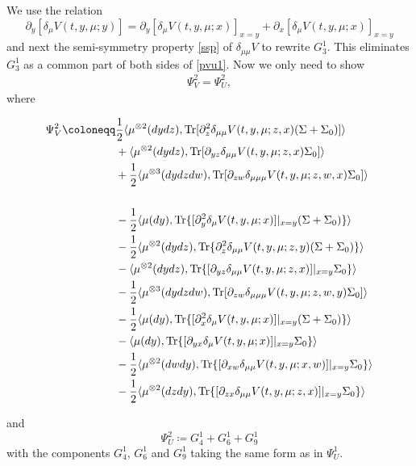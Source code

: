 \documentclass{amsart}
\theoremstyle{definition}
\theoremstyle{remark}
\def\D{\partial}
\numberwithin{equation}{section}
\begin{document}
We use the relation
$$
\partial_y [\delta_\mu  V(t, y,\mu; y)]=\partial_y [\delta_\mu  V(t, y,\mu; x)]_{x=y}+\partial_x [\delta_\mu  V(t, y,\mu; x)]_{x=y}
$$
and next the semi-symmetry property \eqref{ssp} of $\delta_{\mu\mu}V$ to rewrite $G_3^1$.
This eliminates $G_3^1$ as a common part of both sides of \eqref{pvu1}.
Now we only need to show
\begin{align}\label{pp22}
\Psi_V^2=\Psi_U^2,
\end{align}
where
{\allowdisplaybreaks

\begin{align*}
\Psi_V^2\coloneqq
&\hskip -0cm \frac{1}{2}\langle  \mu^{\otimes2}(dydz), {\rm Tr}[
\D_{z}^2 \delta_{\mu\mu}
V(t, y, \mu; z,x) (\Sigma+\Sigma_0)]\rangle \notag \\
&+ \langle \mu^{\otimes2}(dydz), {\rm Tr} [ \D_{yz}\delta_{\mu\mu} V(t,y, \mu;z,x)  \Sigma_0]\rangle \notag  \\
&+\frac{1}{2}\langle\mu^{\otimes3}(dydzdw), {\rm Tr}[\D_{zw}\delta_{\mu\mu\mu} V (t, y, \mu; z,w,x)
\Sigma_0]\rangle \notag\\
&\\
&- \frac{1}{2} \langle \mu(dy),  {\rm Tr}
\{[\D_{y}^2\delta_\mu V(t, y, \mu;x)]|_{x=y}(\Sigma+ \Sigma_0  ) \}\rangle \\
&-\frac{1}{2}\langle  \mu^{\otimes2}(dydz), {\rm Tr}\{
\D_{z}^2 \delta_{\mu\mu}
V(t, y, \mu; z,y) (\Sigma+\Sigma_0)\}\rangle \notag \\
&- \langle \mu^{\otimes2}(dydz), {\rm Tr}\{ [ \D_{yz}\delta_{\mu\mu} V(t,y, \mu;z,x)]|_{x=y}  \Sigma_0 \}\rangle \notag  \\
&-\frac{1}{2}\langle\mu^{\otimes3}(dydzdw), {\rm Tr}[\D_{zw}\delta_{\mu\mu\mu} V (t, y, \mu; z,w,y)
\Sigma_0]\rangle \notag\\
& - \frac{1}{2}\langle\mu(dy), {\rm Tr}\{[
\D_{x}^2 \delta_\mu
V(t, y, \mu; x)]|_{x=y} (\Sigma+\Sigma_0)\}\rangle \\
&-\langle\mu(dy),  {\rm Tr}\{ [ \D_{yx}\delta_\mu V(t,y, \mu;x)]|_{x=y}  \Sigma_0 \}\rangle  \\
& - \frac{1}{2}\langle\mu^{\otimes2}(dwdy), {\rm Tr}\{[\D_{xw}\delta_{\mu\mu} V (t, y, \mu; x,w)]|_{x=y}
\Sigma_0\}\rangle\\
& - \frac{1}{2}\langle\mu^{\otimes2}(dzdy), {\rm Tr}\{[\D_{zx}\delta_{\mu\mu} V (t, y, \mu; z,x)]|_{x=y}
\Sigma_0\}\rangle
\end{align*}
}
and
$$
\Psi_U^2\coloneqq G_4^1+G_6^1+G_9^1
$$
with the components $G_4^1$, $G_6^1$ and $G_9^1$ taking the same form as in $\Psi_U^1$.
\end{document}
